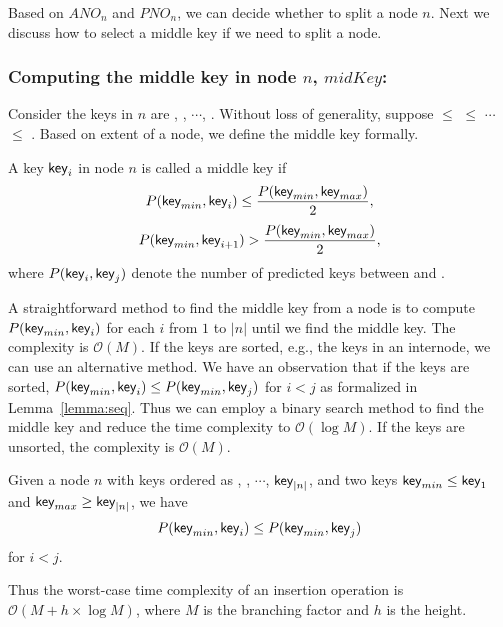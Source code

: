 Based on $ANO_n$ and $PNO_n$, we can decide whether to split a node $n$. Next we discuss how to select a middle key if we need to split a node.


\mbox{}

\subsubsection{Computing the middle key in node $n$, $midKey$:}
Consider the keys in $n$ are , , $\cdots$, . Without loss of generality, suppose  $\leq$  $\leq$  $\cdots$ $\leq$ . Based on extent of a node, we define the middle key formally.



\begin{definition}
A key $\textsf{key}_{i}$ in node $n$ is called a middle key if $$P(\textsf{key}_{min}, \textsf{key}_{i})\leq \frac{P(\textsf{key}_{min}, \textsf{key}_{max})}{2},$$ $$P(\textsf{key}_{min}, \textsf{key}_{i+1})>\frac{P(\textsf{key}_{min}, \textsf{key}_{max})}{2},$$ where $P(\textsf{key}_{i}, \textsf{key}_{j})$ denote the number of predicted keys between  and .
\end{definition}

A straightforward method to find the middle key from a node is to compute $P(\textsf{key}_{min}, \textsf{key}_{i})$ for each $i$ from $1$ to $|n|$ until we find the middle key. The complexity is $\mathcal{O}(M)$. If the keys are sorted, e.g., the keys in an internode, we can use an alternative method. We have an observation that if the keys are sorted, $P(\textsf{key}_{min}, \textsf{key}_{i})\leq P(\textsf{key}_{min}, \textsf{key}_{j})$ for $i<j$ as formalized in Lemma~\ref{lemma:seq}. Thus we can employ a binary search method to find the middle key and reduce the time complexity to $\mathcal{O}(\log M)$. If the keys are unsorted, the complexity is $\mathcal{O}(M)$.


\begin{lemma} \label{lemma:seq}
Given a node $n$ with keys ordered as
, , $\cdots$, $\textsf{key}_{|n|}$, and two keys $\textsf{key}_{min}\leq \textsf{key}_{1}$ and $\textsf{key}_{max}\geq \textsf{key}_{|n|}$, we have $$P(\textsf{key}_{min}, \textsf{key}_{i})\leq P(\textsf{key}_{min}, \textsf{key}_{j})$$ for $i<j$.
\end{lemma}


Thus the worst-case time complexity of an insertion operation is $\mathcal{O}(M+h \times \log M)$, where $M$ is the branching factor and $h$ is the height.




